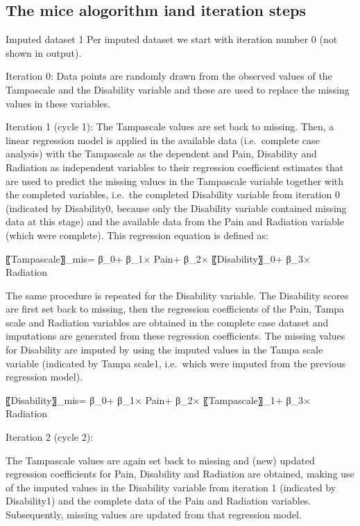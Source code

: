 \documentclass[]{book}
\theoremstyle{definition}
\theoremstyle{definition}
\theoremstyle{definition}
\theoremstyle{remark}
\begin{document}
\subsection{The mice alogorithm iand iteration
steps}\label{the-mice-alogorithm-iand-iteration-steps}

Imputed dataset 1 Per imputed dataset we start with iteration number 0
(not shown in output).

Iteration 0: Data points are randomly drawn from the observed values of
the Tampascale and the Disability variable and these are used to replace
the missing values in these variables.

Iteration 1 (cycle 1): The Tampascale values are set back to missing.
Then, a linear regression model is applied in the available data
(i.e.~complete case analysis) with the Tampascale as the dependent and
Pain, Disability and Radiation as independent variables to their
regression coefficient estimates that are used to predict the missing
values in the Tampascale variable together with the completed variables,
i.e.~the completed Disability variable from iteration 0 (indicated by
Disability0, because only the Disability variable contained missing data
at this stage) and the available data from the Pain and Radiation
variable (which were complete). This regression equation is defined as:

〖Tampascale〗\_mis= β\_0+ β\_1× Pain+ β\_2× 〖Disability〗\_0+ β\_3×
Radiation

The same procedure is repeated for the Disability variable. The
Disability scores are first set back to missing, then the regression
coefficients of the Pain, Tampa scale and Radiation variables are
obtained in the complete case dataset and imputations are generated from
these regression coefficients. The missing values for Disability are
imputed by using the imputed values in the Tampa scale variable
(indicated by Tampa scale1, i.e.~which were imputed from the previous
regression model).

〖Disability〗\_mis= β\_0+ β\_1× Pain+ β\_2× 〖Tampascale〗\_1+ β\_3×
Radiation

Iteration 2 (cycle 2):

The Tampascale values are again set back to missing and (new) updated
regression coefficients for Pain, Disability and Radiation are obtained,
making use of the imputed values in the Disability variable from
iteration 1 (indicated by Disability1) and the complete data of the Pain
and Radiation variables. Subsequently, missing values are updated from
that regression model.
\end{document}
